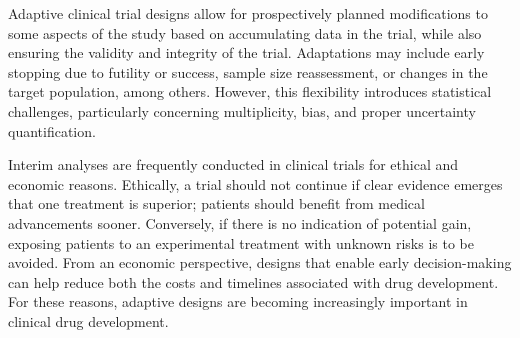 \documentclass[12pt,a4paper]{article}
\begin{document}


Adaptive clinical trial designs allow for prospectively planned modifications to some aspects of the study based on accumulating data in the trial, while also ensuring the validity and integrity of the trial. Adaptations may include early stopping due to futility or success, sample size reassessment, or changes in the target population, among others. However, this flexibility introduces statistical challenges, particularly concerning multiplicity, bias, and proper uncertainty quantification.

Interim analyses are frequently conducted in clinical trials for ethical and economic reasons. Ethically, a trial should not continue if clear evidence emerges that one treatment is superior; patients should benefit from medical advancements sooner. Conversely, if there is no indication of potential gain, exposing patients to an experimental treatment with unknown risks is to be avoided. From an economic perspective, designs that enable early decision-making can help reduce both the costs and timelines associated with drug development. For these reasons, adaptive designs are becoming increasingly important in clinical drug development. 
\end{document}
